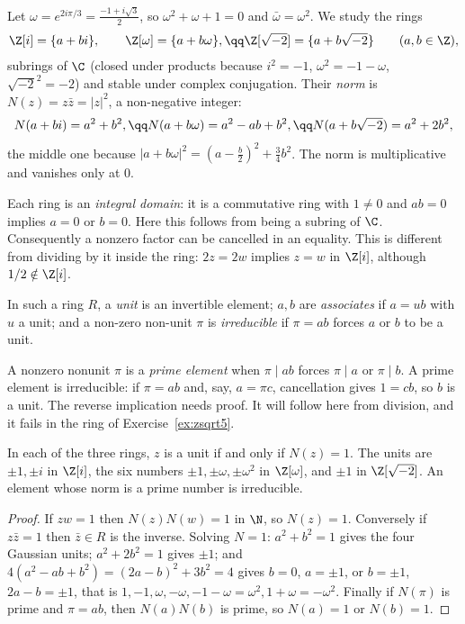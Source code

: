 Let $\omega=e^{2i\pi/3}=\frac{-1+i\sqrt3}2$, so $\omega^2+\omega+1=0$ and $\bar\omega=\omega^2$. We study the rings
\[
\begin{gathered}\Z[i]=\{a+bi\},\qquad\Z[\omega]=\{a+b\omega\},\qq\Z[\sqrt{-2}]=\{a+b\sqrt{-2}\}\qquad(a,b\in\Z),\end{gathered}
\]
subrings of $\C$ (closed under products because $i^2=-1$, $\omega^2=-1-\omega$, $\sqrt{-2}^2=-2$) and stable under complex conjugation. Their \emph{norm} is $N(z)=z\bar z=|z|^2$, a non-negative integer:
\[
\begin{gathered}N(a+bi)=a^2+b^2,\qq N(a+b\omega)=a^2-ab+b^2,\qq N(a+b\sqrt{-2})=a^2+2b^2,\end{gathered}
\]
the middle one because $|a+b\omega|^2=\left(a-\frac b2\right)^2+\frac34b^2$. The norm is multiplicative and vanishes only at $0$.

Each ring is an \emph{integral domain}: it is a commutative ring with
$1\ne0$ and $ab=0$ implies $a=0$ or $b=0$. Here this follows from
being a subring of $\C$. Consequently a nonzero factor can be cancelled
in an equality. This is different from dividing by it inside the ring:
$2z=2w$ implies $z=w$ in $\Z[i]$, although $1/2\notin\Z[i]$.

In such a ring $R$, a \emph{unit} is an invertible element; $a,b$ are \emph{associates} if $a=ub$ with $u$ a unit; and a non-zero non-unit $\pi$ is \emph{irreducible} if $\pi=ab$ forces $a$ or $b$ to be a unit.

A nonzero nonunit $\pi$ is a \emph{prime element} when $\pi\mid ab$
forces $\pi\mid a$ or $\pi\mid b$. A prime element is irreducible:
if $\pi=ab$ and, say, $a=\pi c$, cancellation gives $1=cb$, so
$b$ is a unit. The reverse implication needs proof. It will follow here
from division, and it fails in the ring of Exercise~\ref{ex:zsqrt5}.

\begin{proposition}\label{prop:quadunits}
In each of the three rings, $z$ is a unit if and only if $N(z)=1$. The units are $\pm1,\pm i$ in $\Z[i]$, the six numbers $\pm1,\pm\omega,\pm\omega^2$ in $\Z[\omega]$, and $\pm1$ in $\Z[\sqrt{-2}]$. An element whose norm is a prime number is irreducible.
\end{proposition}
\begin{proof}
If $zw=1$ then $N(z)N(w)=1$ in $\N$, so $N(z)=1$. Conversely if $z\bar z=1$ then $\bar z\in R$ is the inverse. Solving $N=1$: $a^2+b^2=1$ gives the four Gaussian units; $a^2+2b^2=1$ gives $\pm1$; and $4(a^2-ab+b^2)=(2a-b)^2+3b^2=4$ gives $b=0$, $a=\pm1$, or $b=\pm1$, $2a-b=\pm1$, that is $1,-1,\omega,-\omega,-1-\omega=\omega^2,1+\omega=-\omega^2$. Finally if $N(\pi)$ is prime and $\pi=ab$, then $N(a)N(b)$ is prime, so $N(a)=1$ or $N(b)=1$.
\end{proof}

